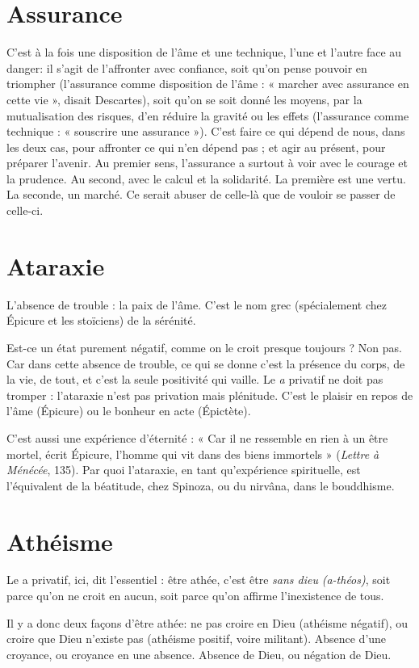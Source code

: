\section{Assurance}
C'est à la fois une disposition de l’âme et une technique, l’une
et l’autre face au danger: il s’agit de l’affronter avec
confiance, soit qu’on pense pouvoir en triompher (l’assurance comme disposition
de l’âme : « marcher avec assurance en cette vie », disait Descartes), soit
qu’on se soit donné les moyens, par la mutualisation des risques, d’en réduire
la gravité ou les effets (l’assurance comme technique : « souscrire une assurance »).
C’est faire ce qui dépend de nous, dans les deux cas, pour affronter ce
qui n’en dépend pas ; et agir au présent, pour préparer l'avenir.
Au premier sens, l’assurance a surtout à voir avec le courage et la prudence.
Au second, avec le calcul et la solidarité. La première est une vertu. La seconde,
un marché. Ce serait abuser de celle-là que de vouloir se passer de celle-ci.

\section{Ataraxie}
L’absence de trouble : la paix de l’âme. C’est le nom grec (spécialement
chez Épicure et les stoïciens) de la sérénité.

Est-ce un état purement négatif, comme on le croit presque toujours ? Non
pas. Car dans cette absence de trouble, ce qui se donne c’est la présence du
corps, de la vie, de tout, et c’est la seule positivité qui vaille. Le {\it a} privatif ne doit
pas tromper : l’ataraxie n’est pas privation mais plénitude. C’est le plaisir en
repos de l’âme (Épicure) ou le bonheur en acte (Épictète).

C’est aussi une expérience d’éternité : « Car il ne ressemble en rien à un être
mortel, écrit Épicure, l'homme qui vit dans des biens immortels » ({\it Lettre à
Ménécée}, 135). Par quoi l’ataraxie, en tant qu’expérience spirituelle, est l’équivalent
de la béatitude, chez Spinoza, ou du nirvâna, dans le bouddhisme.

\section{Athéisme}
Le a privatif, ici, dit l’essentiel : être athée, c’est être {\it sans dieu}
{\it (a-théos)}, soit parce qu’on ne croit en aucun, soit parce qu’on
affirme l’inexistence de tous.

Il y a donc deux façons d’être athée: ne pas croire en Dieu (athéisme
négatif), ou croire que Dieu n’existe pas (athéisme positif, voire militant).
Absence d’une croyance, ou croyance en une absence. Absence de Dieu, ou
négation de Dieu.


